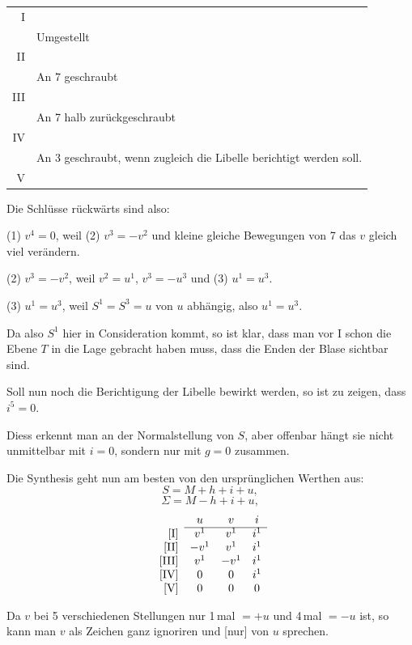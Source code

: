 \begin{center}
\begin{tabular}{r|p{.82\linewidth}}
I & \\
 & Umgestellt\\
II & \\
 & An 7 geschraubt\\
III & \\
 & An 7 halb zurückgeschraubt\\
IV & \\
 & An 3 geschraubt, wenn zugleich die Libelle berichtigt werden soll.\\
V &
\end{tabular}
\end{center}

Die Schl\"usse r\"uckw\"arts sind also:

(1) $v^4=0$, weil (2) $v^3=-v^2$ und kleine gleiche Bewegungen von 7 das $v$ gleich viel ver\"andern.

(2) $v^3=-v^2$, weil $v^2=u^1$, $v^3=-u^3$ und (3) $u^1=u^3$.

(3) $u^1=u^3$, weil $S^1=S^3=u$ von $u$ abh\"angig, also $u^1=u^3$.

Da also $S^1$ hier in Consideration kommt, so ist klar, dass man vor I schon die Ebene $T$ in die Lage gebracht haben muss, dass die Enden der Blase sichtbar sind.

Soll nun noch die Berichtigung der Libelle bewirkt werden, so ist zu zeigen, dass $i^5=0$.

Diess erkennt man an der Normalstellung von $S$, aber offenbar h\"angt sie nicht unmittelbar mit $i=0$, sondern nur mit $g=0$ zusammen.

Die Synthesis geht nun am besten von den urspr\"unglichen Werthen aus:
\[
S = M+h+i+u,
\]
\[
\Sigma = M-h+i+u,
\]
\[
\begin{array}{rccc}
 & u & v & i \\
\cline{2-4}
{[\mathrm{I}]} & v^1 & v^1 & i^1 \\
{[\mathrm{II}]} & -v^1 & v^1 & i^1 \\
{[\mathrm{III}]} & v^1 & -v^1 & i^1 \\
{[\mathrm{IV}]} & 0 & 0 & i^1 \\
{[\mathrm{V}]} & 0 & 0 & 0 \\
\end{array}
\]

Da $v$ bei 5 verschiedenen Stellungen nur 1\,mal $=+u$ und 4\,mal $=-u$ ist, so kann man $v$ als Zeichen ganz ignoriren und [nur] von $u$ sprechen.

